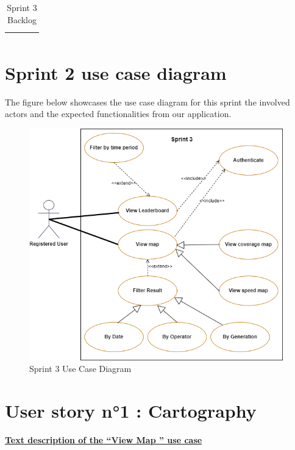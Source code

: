 \begin{table}[H]
\begin{tabular}{|p{}|p{}|p{}|p{}|}
\begin{itemize}[left=0pt, label={\textbf{\Huge .}}]
        \end{itemize} \\ \hline
      
\end{tabular}
       \caption{Sprint 3 Backlog}
        \label{tab:my_label}
    
\end{table}



\newpage

\section{Sprint 2 use case diagram}

The figure below showcases the use case diagram for this sprint the involved actors and the expected functionalities  from our application.

\begin{figure}[H]
    \includegraphics[width=0.98\textwidth]{images/sprint3/Sprint3UC.png}
     \caption{Sprint 3 Use Case Diagram}
    \label{fig:enter-label}
    
\end{figure}

\newpage
\section{User story n°1 : Cartography}
\textbf{\underline{Text description of the “View Map ” use case}}

